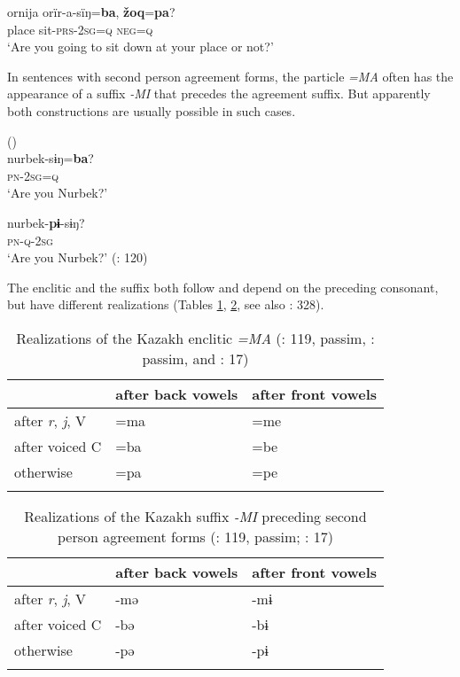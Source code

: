     \ex
    \gll ornija  orïr-a-sïŋ=\textbf{{ba}}, \textbf{{žoq}}{=}\textbf{{pa}}?\\
    place  sit-\textsc{prs}-2\textsc{sg}=\textsc{q}    \textsc{neg}=\textsc{q}\\
    \glt ‘Are you going to sit down at your place or not?’ \citep[18]{Muhamedowa2016}
    \z
    \z

In sentences with second person  agreement forms, the particle \textit{=MA} often has the appearance of a suffix \textit{-MI} that precedes the agreement suffix. But apparently both constructions are usually possible in such cases.

\ea%
    \label{ex:turk:14}
     ()\\
    \ea
    \gll nurbek-sɨŋ=\textbf{{ba}}?\\
    \textsc{pn}-2\textsc{sg}=\textsc{q}\\
    \glt ‘Are you Nurbek?’
    
    \ex
    \gll nurbek-\textbf{{pɨ}}{-sɨŋ?}\\
    \textsc{pn}-\textsc{q}-2\textsc{sg}\\
    \glt ‘Are you Nurbek?’ (\citealt{GengShiminLiZengxiang1985}: 120)
    \z
    \z

The enclitic and the suffix both follow  and depend on the preceding consonant, but have different realizations (Tables \ref{tab:turk:2}, \ref{tab:turk:3}, see also \citealt{Kirchner1998a}: 328).

\begin{table}
\caption{Realizations of the Kazakh enclitic \textit{=MA} (\citealt{GengShiminLiZengxiang1985}: 119, passim, \citealt{ZhangDingjing1991}: passim, and \citealt{Muhamedowa2016}: 17)}
\label{tab:turk:2}

\begin{tabularx}{\textwidth}{XXl}
\lsptoprule
& \textbf{after back vowels} & \textbf{after front vowels}\\
\midrule
after \textit{r}, \textit{j}, V & =ma & =me\\
after voiced C & =ba & =be\\
otherwise & =pa & =pe\\
\lspbottomrule
\end{tabularx}
\end{table}

\begin{table}
\caption{Realizations of the Kazakh suffix \textit{-MI} preceding second person agreement forms (\citealt{GengShiminLiZengxiang1985}: 119, passim; \citealt{Muhamedowa2016}: 17)}
\label{tab:turk:3}

\begin{tabularx}{\textwidth}{XXl}
\lsptoprule
& \textbf{after back vowels} & \textbf{after front vowels}\\
\midrule
after \textit{r}, \textit{j}, V & -mə & -mɨ\\
after voiced C & -bə & -bɨ\\
otherwise & -pə & -pɨ\\
\lspbottomrule
\end{tabularx}
\end{table}

